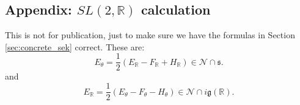 \documentclass[10pt,leqno]{article}
\newcommand{\Norm}{\mathrm{Norm}}
\newcommand{\R}{\mathbb R}
\newcommand{\N}{\mathcal N}
\newcommand{\g}{\mathfrak g}
\newcommand{\s}{\mathfrak s}
\newcommand{\Wh}{\mathrm{Wh}}
\begin{document}
\begin{comment}
\subsection{Bonus}

This section uses the arguments above to deduce the ``folklore fact'' stated by  Jeff and Tasho with a reference to the present paper for the proof. \footnote{AA 2024-VI-7: I don't remember whether this was the most up-to-date version  of our understanding; I seem to remember that we wanted to know that $Q$ acts simply transitively on the large Weyl chambers, and I haven't thought yet about what the relationship this has with what is written below...}


We want to know that if $\pi_1=\pi(\lambda_1),\pi_2=\pi(\lambda_2)$ are large discrete series, then $\Wh(\pi_1)=\Wh(\pi_2)$ if and only $\lambda_1,\lambda_2$
are in the same Weyl chamber.

More precisely, $W$ and $W_K=\Norm_K(T)$ act on $T$, and $\pi(\lambda)=\pi(w\lambda)$ if and only if $\lambda\in W_K$.
So the correct statement is: $\Wh(\pi_1)=\Wh(\pi_2)$ if and only if the Weyl chambers of $\lambda_1,\lambda_2$ are conjugate by $W_K$.

One direction is easy using the above results: we have seen that if $\lambda_1,\lambda_2$
are in the same Weyl chamber then the wavefront set, therefore the Whittaker model, are the same. 

What we need to show:
$\Wh(\pi(\lambda_1))=\Wh(\pi(\lambda_2)\Rightarrow \mathcal C(\lambda_1)$ is $W_K$-conjugate to  $\mathcal C(\lambda_2)$.

We may as well assume $\pi(\lambda_1),\pi(\lambda_2)$ are in the same $L$-packet, i.e. $\lambda_2=w\lambda_1$ for some $w\in W$.We know that $Q$ acts simply transitively on the large discrete series in the $L$-packet, and on principal nilpotent orbits.
Also: this action is given by the action of $W$, i.e. if $g\in Q$ then $\pi(\lambda)^g=\pi(g\lambda)=\pi(w\lambda)$ for some $w\in W$.
So
$$
\Wh(\pi_1)=\Wh(\pi_2)\Leftrightarrow \pi_1\simeq \pi_2\Leftrightarrow \lambda_1\sim_{W_K}\lambda_2\Leftrightarrow \mathcal C_1\sim_{W_K}\mathcal C_2
$$
\end{comment}
\subsection{Appendix: $SL(2,\R)$ calculation}

This is not for publication, just to make sure we have the formulas in Section \ref{sec:concrete_sek} correct.
These are:
$$
E_\theta=\frac12(E_\R-F_\R+H_\R)\in \N\cap \s.
$$
and
$$
E_\R=\frac 12(E_\theta-F_\theta-H_\theta)\in\N\cap i\g(\R).
$$
\end{document}
